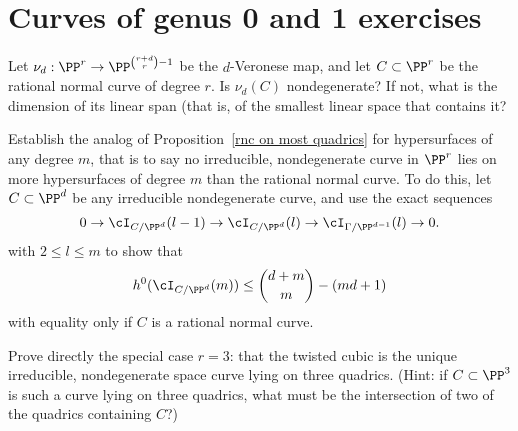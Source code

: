 


\chapter{Curves of genus 0 and 1 exercises}\label{genus 0 and 1 exercises}

\begin{exercise}
 Let $\nu_d: \PP^r \to \PP^{\binom{r+d}{r}-1}$ be the $d$-Veronese map, and let $C\subset \PP^r$ be the rational normal curve of degree $r$. Is $\nu_d(C)$ nondegenerate? If not, what is the dimension of its linear span (that is, of the smallest linear
 space that contains it?
\end{exercise}

\begin{exercise}
Establish the analog of Proposition~\ref{rnc on most quadrics} for hypersurfaces of any degree $m$, that is to say no irreducible, nondegenerate curve in $\PP^r$ lies on more hypersurfaces of degree $m$ than the rational normal curve.
To do this, let $C\subset \PP^d$ be any irreducible nondegenerate curve, and use the exact sequences
$$
0 \to \cI_{C/\PP^d}(l-1) \to \cI_{C/\PP^d}(l) \to \cI_{\Gamma/\PP^{d-1}}(l) \to 0.
$$ 
with $2 \leq l \leq m$ to show that
$$
h^0(\cI_{C/\PP^d}(m)) \leq  \binom{d+m}{m} - (md+1)
$$
with equality only if $C$ is a rational normal curve.
\end{exercise}

\begin{exercise}
Prove directly  the special case $r=3$: that the twisted cubic is the unique irreducible, nondegenerate space curve lying on three quadrics. (Hint: if $C \subset \PP^3$ is such a curve lying on three quadrics, what must be the intersection of two of the quadrics containing $C$?)
\end{exercise}


